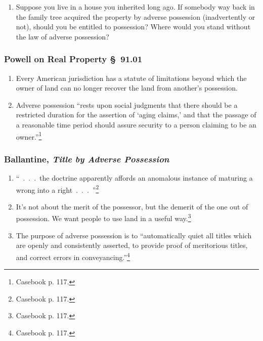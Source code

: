 \begin{enumerate}
\begin{enumerate}
        cow has a calf, and then B  gets title to the cow by adverse 
        possession, B also owns the calf---even though the calf was born 
        before B had title to its mother.\footnote{Casebook p. 119 n. 2.}
        \item Suppose you live in a house you inherited long ago. If somebody 
        way back in the family tree acquired the property by adverse 
        possession (inadvertently or not), should you be entitled to 
        possession? Where would you stand without the law of adverse 
        possession?
    \end{enumerate}
\end{enumerate}

\subsubsection{Powell on Real Property \S\ 91.01}

\begin{enumerate}
    \item Every American jurisdiction has a statute of limitations beyond 
    which the owner of land can no longer recover the land from another's 
    possession.
    \item Adverse possession ``rests upon social judgments that there should 
    be a restricted duration for the assertion of `aging claims,' and that the 
    passage of a reasonable time period should assure security to a person 
    claiming to be an owner.''\footnote{Casebook p. 117.}
\end{enumerate}

\subsubsection{Ballantine, \emph{Title by Adverse Possession}}

\begin{enumerate}
    \item ``~.~.~.~the doctrine apparently affords an anomalous instance of 
    maturing a wrong into a right~.~.~.~''\footnote{Casebook p. 117.}
    \item It's not about the merit of the possessor, but the demerit of the 
    one out of possession. We want people to use land in a useful 
    way.\footnote{Casebook p. 117.}
    \item The purpose of adverse possession is to ``automatically quiet all 
    titles which are openly and consistently asserted, to provide proof of 
    meritorious titles, and correct errors in 
    conveyancing.''\footnote{Casebook p. 117.}
\end{enumerate}

